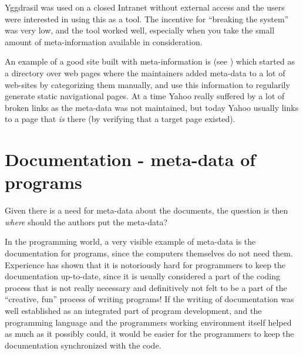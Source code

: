 Yggdrasil was used on a closed Intranet without external
access and the users were interested in using this as a
tool.  The incentive for ``breaking the system'' was very
low, and the tool worked well, especially when you take the
small amount of meta-information available in consideration.



An example of a good site built with meta-information is
 (see
) which started as a directory over
web pages where the maintainers added meta-data to a lot of
web-sites by categorizing them manually, and use this
information to regularily generate static navigational
pages.  At a time Yahoo really suffered by a lot of broken
links as the meta-data was not maintained, but today Yahoo
usually links to a page that \textit{is} there (by verifying
that a target page existed).


\section{Documentation - meta-data of programs}


Given there is a need for meta-data about the documents, the question
is then \textit{where} should the authors put the meta-data?


In the programming world, a very visible example of meta-data is the
documentation for programs, since the computers themselves do not need
them.  Experience has shown that it is notoriously hard for
programmers to keep the documentation up-to-date, since it is usually
considered a part of the coding process that is not really necessary
and definitively not felt to be a part of the ``creative, fun''
process of writing programs!  If the writing of documentation was well
established as an integrated part of program development, and the
programming language and the programmers working environment itself
helped as much as it possibly could, it would be easier for the
programmers to keep the documentation synchronized with the code.

